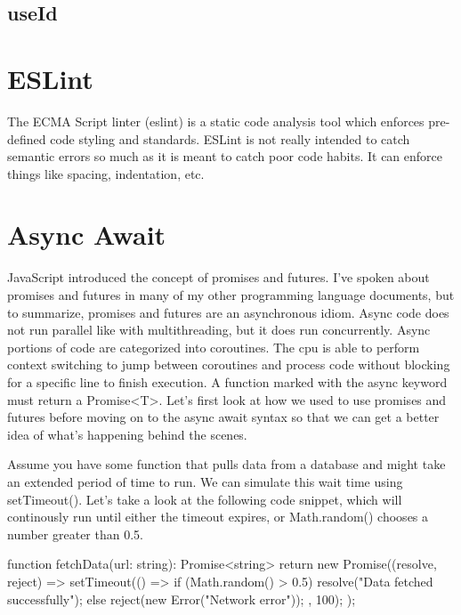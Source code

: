 \documentclass{article}
\begin{document}
\subsection{useId}

\section{ESLint}

The ECMA Script linter (eslint) is a static code analysis tool which enforces pre-defined code styling and
standards. ESLint is not really intended to catch semantic errors so much as it is meant to catch poor code
habits. It can enforce things like spacing, indentation, etc.

\section{Async Await}

JavaScript introduced the concept of promises and futures. I've spoken about promises and futures in many of my
other programming language documents, but to summarize, promises and futures are an asynchronous idiom. Async
code does not run parallel like with multithreading, but it does run concurrently. Async portions of code are
categorized into coroutines. The cpu is able to perform context switching to jump between coroutines and
process code without blocking for a specific line to finish execution. A function marked with the async
keyword must return a Promise<T>. Let's first look at how we used to use promises and futures before moving on
to the async await syntax so that we can get a better idea of what's happening behind the scenes.

Assume you have some function that pulls data from a database and might take an extended period of time to run.
We can simulate this wait time using setTimeout(). Let's take a look at the following code snippet, which will
continously run until either the timeout expires, or Math.random() chooses a number greater than 0.5.

\begin{tslst}

function fetchData(url: string): Promise<string> {
    return new Promise((resolve, reject) => {
        setTimeout(() => {
            if (Math.random() > 0.5) {
                resolve("Data fetched successfully");
            } else {
                reject(new Error("Network error"));
            }
        }, 100);
    });
}

\end{tslst}
\end{document}
